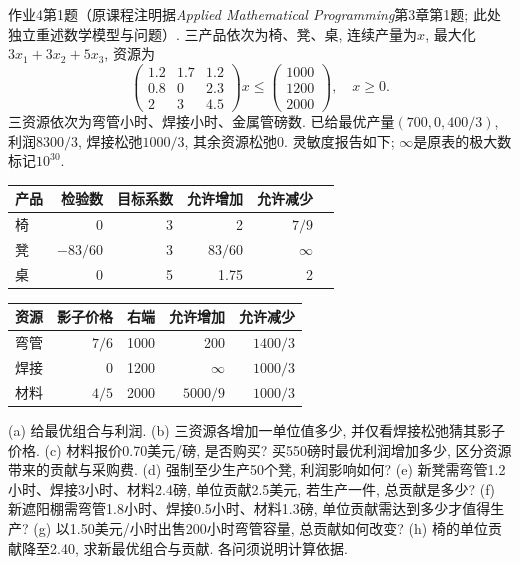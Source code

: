 \begin{exercise}\label{ass:15053-ps4-q1}
作业4第1题（原课程注明据\emph{Applied Mathematical Programming}第3章第1题; 此处独立重述数学模型与问题）. 三产品依次为椅、凳、桌, 连续产量为$x$, 最大化$3x_1+3x_2+5x_3$, 资源为
\[
\begin{pmatrix}1.2&1.7&1.2\\0.8&0&2.3\\2&3&4.5\end{pmatrix}x\le
\begin{pmatrix}1000\\1200\\2000\end{pmatrix},\quad x\ge0.
\]
三资源依次为弯管小时、焊接小时、金属管磅数. 已给最优产量$(700,0,400/3)$, 利润$8300/3$, 焊接松弛$1000/3$, 其余资源松弛0. 灵敏度报告如下; $\infty$是原表的极大数标记$10^{30}$.
\begin{center}\begin{tabular}{lrrrrr}\toprule
产品&检验数&目标系数&允许增加&允许减少\\\midrule
椅&0&3&2&$7/9$\\
凳&$-83/60$&3&$83/60$&$\infty$\\
桌&0&5&1.75&2\\\bottomrule
\end{tabular}\quad
\begin{tabular}{lrrrr}\toprule
资源&影子价格&右端&允许增加&允许减少\\\midrule
弯管&$7/6$&1000&200&$1400/3$\\
焊接&0&1200&$\infty$&$1000/3$\\
材料&$4/5$&2000&$5000/9$&$1000/3$\\\bottomrule
\end{tabular}\end{center}
(a) 给最优组合与利润. (b) 三资源各增加一单位值多少, 并仅看焊接松弛猜其影子价格. (c) 材料报价0.70美元/磅, 是否购买? 买550磅时最优利润增加多少, 区分资源带来的贡献与采购费. (d) 强制至少生产50个凳, 利润影响如何? (e) 新凳需弯管1.2小时、焊接3小时、材料2.4磅, 单位贡献2.5美元, 若生产一件, 总贡献是多少? (f) 新遮阳棚需弯管1.8小时、焊接0.5小时、材料1.3磅, 单位贡献需达到多少才值得生产? (g) 以1.50美元/小时出售200小时弯管容量, 总贡献如何改变? (h) 椅的单位贡献降至2.40, 求新最优组合与贡献. 各问须说明计算依据.
\end{exercise}
